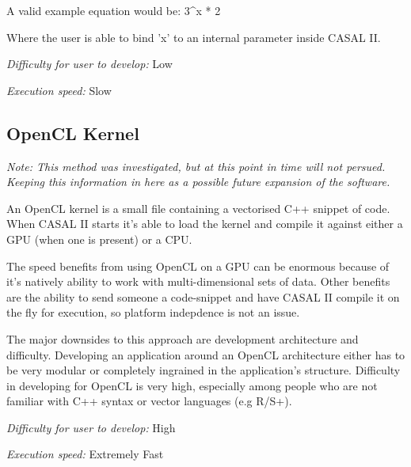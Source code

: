 \documentclass[a4paper,11pt,twoside,pdftex,draft]{article}
\begin{document}
A valid example equation would be: 3\^{}x * 2

Where the user is able to bind 'x' to an internal parameter inside CASAL
II.

\emph{Difficulty for user to develop:} Low

\emph{Execution speed:} Slow

\hypertarget{opencl-kernel}{%
\subsection{OpenCL Kernel}\label{opencl-kernel}}

\emph{Note: This method was investigated, but at this point in time will
not persued. Keeping this information in here as a possible future
expansion of the software.}

An OpenCL kernel is a small file containing a vectorised C++ snippet of
code. When CASAL II starts it's able to load the kernel and compile it
against either a GPU (when one is present) or a CPU.

The speed benefits from using OpenCL on a GPU can be enormous because of
it's natively ability to work with multi-dimensional sets of data. Other
benefits are the ability to send someone a code-snippet and have CASAL
II compile it on the fly for execution, so platform indepdence is not an
issue.

The major downsides to this approach are development architecture and
difficulty. Developing an application around an OpenCL architecture
either has to be very modular or completely ingrained in the
application's structure. Difficulty in developing for OpenCL is very
high, especially among people who are not familiar with C++ syntax or
vector languages (e.g R/S+).

\emph{Difficulty for user to develop:} High

\emph{Execution speed:} Extremely Fast
\end{document}
